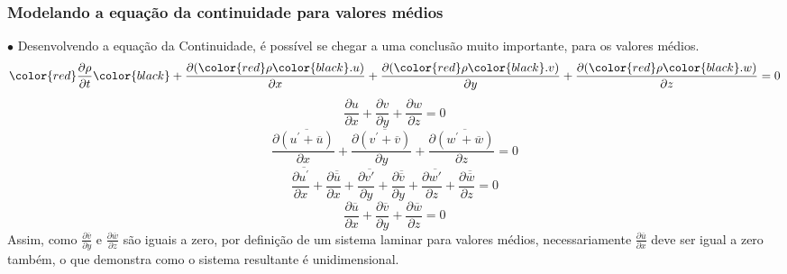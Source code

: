 \documentclass[xcolor=dvipsnames,10pt,aspectratio=169]{beamer}
\begin{document}
		
		
		
		
		\begin{frame}
			\frametitle{Modelando a equação da continuidade para valores médios}
			$\bullet$ Desenvolvendo a equação da Continuidade, é possível se chegar a uma conclusão muito importante, para os valores médios.
			\begin{equation*}
			\color{red}\frac{\partial \rho}{\partial t} \color{black}+  \frac{\partial (\color{red}\rho \color{black}.u)}{\partial x} + \frac{\partial (\color{red} \rho \color{black}.v)}{\partial y} + \frac{\partial (\color{red}\rho \color{black}.w)}{\partial z} = 0
			\end{equation*}
			\begin{equation}
			\frac{\partial u}{\partial x} + \frac{\partial v}{\partial y} + \frac{\partial w}{\partial z} = 0
			\end{equation}
			\begin{equation}
			\frac{\partial \overline{(u^\prime + \overline{u})}}{\partial x} + \frac{\partial \overline{(v^\prime + \overline{v})}}{\partial y} + \frac{\partial \overline{(w^\prime + \overline{w})}}{\partial z} = 0
			\end{equation}
			\begin{equation}
			\frac{\partial \overline{u^\prime}}{\partial x} +\frac{\partial \overline{\overline{u}}}{\partial x} + \frac{\partial \overline{v\prime}}{\partial y} +\frac{\partial \overline{\overline{v}}}{\partial y} + \frac{\partial \overline{w\prime}}{\partial z} +\frac{\partial \overline{\overline{w}}}{\partial z} = 0
			\end{equation}
			\begin{equation}
			\frac{\partial {\overline{u}}}{\partial x} +\frac{\partial {\overline{v}}}{\partial y} +\frac{\partial {\overline{w}}}{\partial z} = 0
			\end{equation}
			Assim, como $ \frac{\partial {\overline{v}}}{\partial y} $ e $ \frac{\partial {\overline{w}}}{\partial z}$ são iguais a zero, por definição de um sistema laminar para valores médios, necessariamente $\frac{\partial {\overline{u}}}{\partial x}$ deve ser igual a zero também, o que demonstra como o sistema resultante é unidimensional.
		\end{frame}
		
		
		
\end{document}
